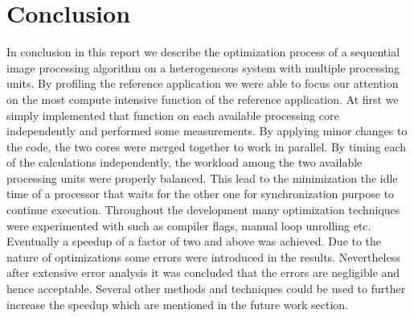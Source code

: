\section{Conclusion}

In conclusion in this report we describe the optimization process of a sequential image processing algorithm on a heterogeneous system with multiple processing units.
By profiling the reference application we were able to focus our attention on the most compute intensive function of the reference application.
At first we simply implemented that function on each available processing core independently and performed some measurements. By applying minor changes to the code, the two cores were merged together to work in parallel.
By timing each of the calculations independently, the workload among the two available processing units were properly balanced.
This lead to the minimization the idle time of a processor that waits for the other one for synchronization purpose to continue execution.
Throughout the development many optimization techniques were experimented with such as compiler flags, manual loop unrolling etc.
Eventually a speedup of a factor of two and above was achieved. Due to the nature of optimizations some errors were introduced in the results. Nevertheless after extensive error analysis it was concluded that the errors are negligible and hence acceptable. Several other methods and techniques could be used to further increase the speedup which are mentioned in the future work section.